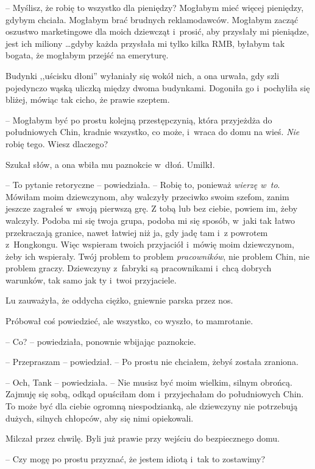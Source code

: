 \documentclass[oneside,polish,11pt,rmheadings]{mwbk}
\begin{document}
-- Myślisz, że robię to wszystko dla pieniędzy? Mogłabym mieć więcej pieniędzy, gdybym chciała. Mogłabym brać brudnych reklamodawców. Mogłabym zacząć oszustwo marketingowe dla moich dziewcząt i~prosić, aby przysłały mi pieniądze, jest ich miliony  \ldots  gdyby każda przysłała mi tylko kilka RMB, byłabym tak bogata, że mogłabym przejść na emeryturę.

Budynki ,,uścisku dłoni'' wyłaniały się wokół nich, a ona urwała, gdy szli pojedynczo wąską uliczką między dwoma budynkami. Dogoniła go i~pochyliła się bliżej, mówiąc tak cicho, że prawie szeptem. 

-- Mogłabym być po prostu kolejną przestępczynią, która przyjeżdża do południowych Chin, kradnie wszystko, co może, i~wraca do domu na wieś. \textit{Nie }robię tego. Wiesz dlaczego?

Szukał słów, a ona wbiła mu paznokcie w~dłoń. Umilkł.

-- To pytanie retoryczne -- powiedziała. -- Robię to, ponieważ \textit{wierzę w~to}. Mówiłam moim dziewczynom, aby walczyły przeciwko swoim szefom, zanim jeszcze zagrałeś w~swoją pierwszą grę. Z tobą lub bez ciebie, powiem im, żeby walczyły. Podoba mi się twoja grupa, podoba mi się sposób, w~jaki tak łatwo przekraczają granice, nawet łatwiej niż ja, gdy jadę tam i~z powrotem z~Hongkongu. Więc wspieram twoich przyjaciół i~mówię moim dziewczynom, żeby ich wspierały. Twój problem to problem \textit{pracowników}, nie problem Chin, nie problem graczy. Dziewczyny z~fabryki są pracownikami i~chcą dobrych warunków, tak samo jak ty i~twoi przyjaciele.

Lu zauważyła, że oddycha ciężko, gniewnie parska przez nos.

Próbował coś powiedzieć, ale wszystko, co wyszło, to mamrotanie.

-- Co? -- powiedziała, ponownie wbijając paznokcie.

-- Przepraszam -- powiedział. -- Po prostu nie chciałem, żebyś została zraniona.

-- Och, Tank -- powiedziała. -- Nie musisz być moim wielkim, silnym obrońcą. Zajmuję się sobą, odkąd opuściłam dom i~przyjechałam do południowych Chin. To może być dla ciebie ogromną niespodzianką, ale dziewczyny nie potrzebują dużych, silnych chłopców, aby się nimi opiekowali.

Milczał przez chwilę. Byli już prawie przy wejściu do bezpiecznego domu. 

-- Czy mogę po prostu przyznać, że jestem idiotą i~tak to zostawimy?
\end{document}
